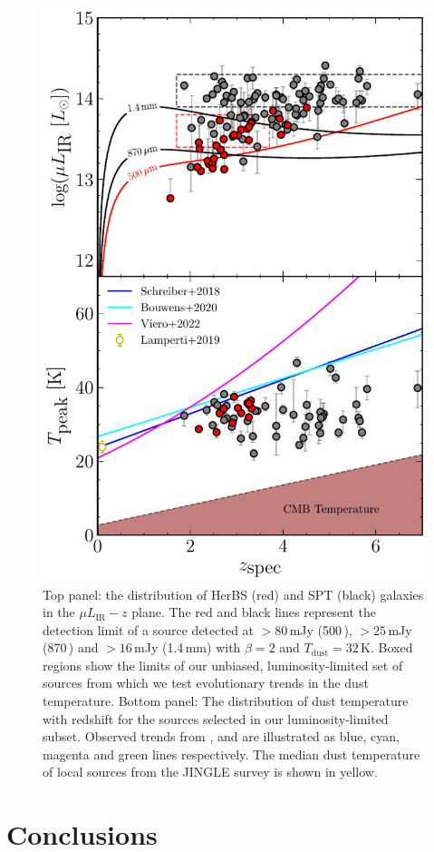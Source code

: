 \begin{figure}
	\centering
	\includegraphics[width=0.75\columnwidth]{Figures/t_evolution.pdf}
	\caption{Top panel: the distribution of HerBS (red) and SPT (black) galaxies in the $\mu L_{\textrm{IR}}-z$ plane. The red and black lines represent the detection limit of a source detected at $> 80$\,mJy (500\,\micron), $> 25$\,mJy (870\,\micron) and $> 16$\,mJy (1.4\,mm) with $\beta = 2$ and $T_{\textrm{dust}} = 32$\,K. Boxed regions show the limits of our unbiased, luminosity-limited set of sources from which we test evolutionary trends in the dust temperature. Bottom panel: The distribution of dust temperature with redshift for the sources selected in our luminosity-limited subset. Observed trends from \citealt{Schreiber_2018}, \citealt{Bouwens_2020} and \citealt{Viero_2022} are illustrated as blue, cyan, magenta and green lines respectively. The median dust temperature of local sources from the JINGLE survey is shown in yellow.}
	\label{fig:t_evolution}
\end{figure}

\section{Conclusions}
